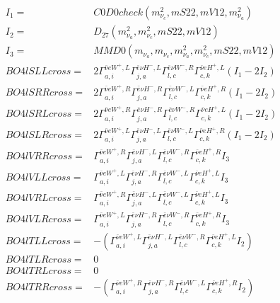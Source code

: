 \documentclass[A4,landscape]{article}
\begin{document}
\begin{align} 
I_1 = & C0D0check(m^2_{\nu_{{c}}}, mS22, mV12, m^2_{\nu_{{a}}}) \\ 
I_2 = & D_{27}(m^2_{\nu_{{a}}}, m^2_{\nu_{{c}}}, mS22, mV12) \\ 
I_3 = & MMD0(m_{\nu_{{a}}}, m_{\nu_{{c}}}, m^2_{\nu_{{a}}}, m^2_{\nu_{{c}}}, mS22, mV12) \\ 
  BO4lSLLcross= & 2  \Gamma^{\bar{\nu}e W^+ ,L}_{a, i} \Gamma^{\bar{e}\nu H^-,L}_{j, a} \Gamma^{\bar{e}\nu W^-,R}_{l, c} \Gamma^{\bar{\nu}e H^+ ,L}_{c, k} (I_1 - 2 I_2) \\ 
  BO4lSRRcross= & 2  \Gamma^{\bar{\nu}e W^+ ,R}_{a, i} \Gamma^{\bar{e}\nu H^-,R}_{j, a} \Gamma^{\bar{e}\nu W^-,L}_{l, c} \Gamma^{\bar{\nu}e H^+ ,R}_{c, k} (I_1 - 2 I_2) \\ 
  BO4lSRLcross= & 2  \Gamma^{\bar{\nu}e W^+ ,R}_{a, i} \Gamma^{\bar{e}\nu H^-,R}_{j, a} \Gamma^{\bar{e}\nu W^-,R}_{l, c} \Gamma^{\bar{\nu}e H^+ ,L}_{c, k} (I_1 - 2 I_2) \\ 
  BO4lSLRcross= & 2  \Gamma^{\bar{\nu}e W^+ ,L}_{a, i} \Gamma^{\bar{e}\nu H^-,L}_{j, a} \Gamma^{\bar{e}\nu W^-,L}_{l, c} \Gamma^{\bar{\nu}e H^+ ,R}_{c, k} (I_1 - 2 I_2) \\ 
  BO4lVRRcross= &  \Gamma^{\bar{\nu}e W^+ ,R}_{a, i} \Gamma^{\bar{e}\nu H^-,L}_{j, a} \Gamma^{\bar{e}\nu W^-,R}_{l, c} \Gamma^{\bar{\nu}e H^+ ,R}_{c, k} I_3 \\ 
  BO4lVLLcross= &  \Gamma^{\bar{\nu}e W^+ ,L}_{a, i} \Gamma^{\bar{e}\nu H^-,R}_{j, a} \Gamma^{\bar{e}\nu W^-,L}_{l, c} \Gamma^{\bar{\nu}e H^+ ,L}_{c, k} I_3 \\ 
  BO4lVRLcross= &  \Gamma^{\bar{\nu}e W^+ ,R}_{a, i} \Gamma^{\bar{e}\nu H^-,L}_{j, a} \Gamma^{\bar{e}\nu W^-,L}_{l, c} \Gamma^{\bar{\nu}e H^+ ,L}_{c, k} I_3 \\ 
  BO4lVLRcross= &  \Gamma^{\bar{\nu}e W^+ ,L}_{a, i} \Gamma^{\bar{e}\nu H^-,R}_{j, a} \Gamma^{\bar{e}\nu W^-,R}_{l, c} \Gamma^{\bar{\nu}e H^+ ,R}_{c, k} I_3 \\ 
  BO4lTLLcross= & -( \Gamma^{\bar{\nu}e W^+ ,L}_{a, i} \Gamma^{\bar{e}\nu H^-,L}_{j, a} \Gamma^{\bar{e}\nu W^-,R}_{l, c} \Gamma^{\bar{\nu}e H^+ ,L}_{c, k} I_2) \\ 
  BO4lTLRcross= & 0 \\ 
  BO4lTRLcross= & 0 \\ 
  BO4lTRRcross= & -( \Gamma^{\bar{\nu}e W^+ ,R}_{a, i} \Gamma^{\bar{e}\nu H^-,R}_{j, a} \Gamma^{\bar{e}\nu W^-,L}_{l, c} \Gamma^{\bar{\nu}e H^+ ,R}_{c, k} I_2) \\ 
\end{align} 
\end{document}
